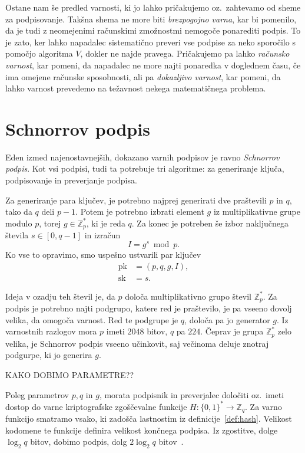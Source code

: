 \documentclass[isrm2, tisk]{fmfdelo}
\newcommand{\Z}{\mathbb Z}
\begin{document}
Ostane nam še predled varnosti, ki jo lahko pričakujemo oz.\ zahtevamo od sheme za podpisovanje. 
Takšna shema ne more biti \textit{brezpogojno varna}, kar bi pomenilo, da je tudi z neomejenimi 
računskimi zmožnostmi nemogoče ponarediti podpis. To je zato, ker lahko napadalec sistematično 
preveri vse podpise za neko sporočilo s pomočjo algoritma $V$, dokler ne najde pravega. Pričakujemo 
pa lahko \textit{računsko varnost}, kar pomeni, da napadalec ne more najti ponaredka v doglednem času,
če ima omejene računske sposobnosti, ali pa \textit{dokazljivo varnost}, kar pomeni, da lahko 
varnost prevedemo na težavnost nekega matematičnega problema.

\section{Schnorrov podpis}
Eden izmed najenostavnejših, dokazano varnih podpisov je ravno \textit{Schnorrov podpis}. Kot vsi 
podpisi, tudi ta potrebuje tri algoritme: za generiranje ključa, podpisovanje in preverjanje 
podpisa. 

Za generiranje para ključev, je potrebno najprej generirati dve praštevili $p$ in $q$, tako da $q$ 
deli $p-1$. Potem je potrebno izbrati element $g$ iz multiplikativne grupe modulo $p$, torej 
$g \in \Z_p^*$, ki je reda $q$. Za konec je potreben še izbor naključnega števila $s \in [0, q - 1]$
in izračun 
$$ 
I = g^s \bmod p.
$$
Ko vse to opravimo, smo uspešno ustvarili par ključev
\begin{align*}
\text{pk} &= (p, q, g, I), \\
\text{sk} &= s.
\end{align*}

Ideja v ozadju teh števil je, da $p$ določa multiplikativno grupo števil $\Z_p^*$. Za podpis je 
potrebno najti podgrupo, katere red je praštevilo, je pa vseeno dovolj velika, da omogoča varnost. 
Red te podgrupe je $q$, določa pa jo generator $g$. Iz varnostnih razlogov mora $p$ imeti $2048$ 
bitov, $q$ pa $224$. Čeprav je grupa $\Z_p^*$ zelo velika, je Schnorrov podpis vseeno učinkovit, 
saj večinoma deluje znotraj podgurpe, ki jo generira $g$.

KAKO DOBIMO PARAMETRE??

Poleg parametrov $p, q$ in $g$, morata podpisnik in preverjalec določiti oz.\ imeti dostop do varne 
kriptografske zgoščevalne funkcije $H : \{0, 1\}^* \rightarrow \Z_q$. Za varno funkcijo smatramo vsako, 
ki zadošča lastnostim iz definicije~\ref{def:hash}. Velikost kodomene te funkcije definira velikost 
končnega podpisa. Iz zgostitve, dolge $\log_2 q$ bitov, dobimo podpis, dolg $2 \log_2 q$ bitov~\cite{
stinson2023crypto}.
\end{document}
